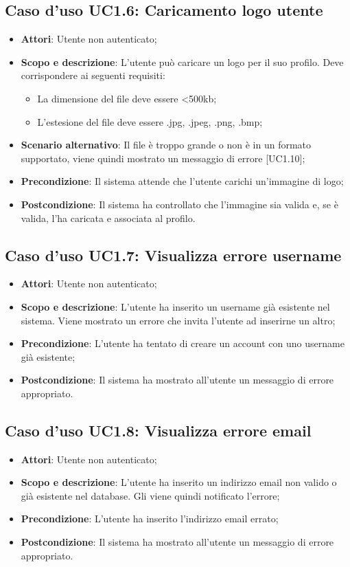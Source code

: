 \documentclass[12pt,a4paper,titlepage]{article}
\begin{document}
	\subsection{Caso d'uso UC1.6: Caricamento logo utente}
	\label{UC1.6}
	\begin{itemize}
		\item \textbf{Attori}: Utente non autenticato;
		\item \textbf{Scopo e descrizione}: L'utente può caricare un logo per il suo profilo. Deve corrispondere ai seguenti requisiti:
		\begin{itemize}
			\item La dimensione del file deve essere <500kb;
			\item L'estesione del file deve essere .jpg, .jpeg, .png, .bmp;
		\end{itemize}
		\item \textbf{Scenario alternativo}: Il file è troppo grande o non è in un formato supportato, viene quindi mostrato un messaggio di errore [UC1.10];
		\item \textbf{Precondizione}: Il sistema attende che l'utente carichi un'immagine di logo;
		\item \textbf{Postcondizione}: Il sistema ha controllato che l'immagine sia valida e, se è valida, l'ha caricata e associata al profilo.
	\end{itemize}
	\subsection{Caso d'uso UC1.7: Visualizza errore username}
	\label{UC1.7}
	\begin{itemize}
		\item \textbf{Attori}: Utente non autenticato;
		\item \textbf{Scopo e descrizione}: L'utente ha inserito un username già esistente nel sistema. Viene mostrato un errore che invita l'utente ad inserirne un altro;
		\item \textbf{Precondizione}: L'utente ha tentato di creare un account con uno username già esistente;
		\item \textbf{Postcondizione}: Il sistema ha mostrato all'utente un messaggio di errore appropriato.
	\end{itemize}
	\subsection{Caso d'uso UC1.8: Visualizza errore email}
	\label{UC1.8}
	\begin{itemize}
		\item \textbf{Attori}: Utente non autenticato;
		\item \textbf{Scopo e descrizione}: L'utente ha inserito un indirizzo email non valido o già esistente nel database. Gli viene quindi notificato l'errore;
		\item \textbf{Precondizione}: L'utente ha inserito l'indirizzo email errato;
		\item \textbf{Postcondizione}: Il sistema ha mostrato all'utente un messaggio di errore appropriato.
	\end{itemize}
\end{document}
